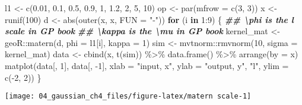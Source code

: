 \documentclass[
]{article}
\newenvironment{Shaded}{\begin{snugshade}}{\end{snugshade}}
\newcommand{\AttributeTok}[1]{\textcolor[rgb]{0.77,0.63,0.00}{#1}}
\newcommand{\ControlFlowTok}[1]{\textcolor[rgb]{0.13,0.29,0.53}{\textbf{#1}}}
\newcommand{\DecValTok}[1]{\textcolor[rgb]{0.00,0.00,0.81}{#1}}
\newcommand{\DocumentationTok}[1]{\textcolor[rgb]{0.56,0.35,0.01}{\textbf{\textit{#1}}}}
\newcommand{\FloatTok}[1]{\textcolor[rgb]{0.00,0.00,0.81}{#1}}
\newcommand{\FunctionTok}[1]{\textcolor[rgb]{0.00,0.00,0.00}{#1}}
\newcommand{\NormalTok}[1]{#1}
\newcommand{\OtherTok}[1]{\textcolor[rgb]{0.56,0.35,0.01}{#1}}
\newcommand{\SpecialCharTok}[1]{\textcolor[rgb]{0.00,0.00,0.00}{#1}}
\newcommand{\StringTok}[1]{\textcolor[rgb]{0.31,0.60,0.02}{#1}}
\begin{document}
\begin{Shaded}
\begin{Highlighting}[]
\NormalTok{l1 }\OtherTok{\textless{}{-}} \FunctionTok{c}\NormalTok{(}\FloatTok{0.01}\NormalTok{, }\FloatTok{0.1}\NormalTok{,  }\FloatTok{0.5}\NormalTok{,}
         \FloatTok{0.9}\NormalTok{,   }\DecValTok{1}\NormalTok{,  }\FloatTok{1.2}\NormalTok{, }
           \DecValTok{2}\NormalTok{,   }\DecValTok{5}\NormalTok{,  }\DecValTok{10}\NormalTok{)}
\NormalTok{op }\OtherTok{\textless{}{-}} \FunctionTok{par}\NormalTok{(}\AttributeTok{mfrow =} \FunctionTok{c}\NormalTok{(}\DecValTok{3}\NormalTok{, }\DecValTok{3}\NormalTok{))}
\NormalTok{x }\OtherTok{\textless{}{-}} \FunctionTok{runif}\NormalTok{(}\DecValTok{100}\NormalTok{)}
\NormalTok{d }\OtherTok{\textless{}{-}} \FunctionTok{abs}\NormalTok{(}\FunctionTok{outer}\NormalTok{(x, x, }\AttributeTok{FUN =} \StringTok{"{-}"}\NormalTok{))}
\ControlFlowTok{for}\NormalTok{ (i }\ControlFlowTok{in} \DecValTok{1}\SpecialCharTok{:}\DecValTok{9}\NormalTok{) \{}
  \DocumentationTok{\#\# \textbackslash{}phi is the l scale in GP book}
  \DocumentationTok{\#\# \textbackslash{}kappa is the \textbackslash{}mu in GP book}
\NormalTok{  kernel\_mat }\OtherTok{\textless{}{-}}\NormalTok{ geoR}\SpecialCharTok{::}\FunctionTok{matern}\NormalTok{(d, }\AttributeTok{phi =}\NormalTok{ l1[i], }\AttributeTok{kappa =} \DecValTok{1}\NormalTok{) }
\NormalTok{  sim }\OtherTok{\textless{}{-}}\NormalTok{ mvtnorm}\SpecialCharTok{::}\FunctionTok{rmvnorm}\NormalTok{(}\DecValTok{10}\NormalTok{, }\AttributeTok{sigma =}\NormalTok{ kernel\_mat)}
\NormalTok{  data }\OtherTok{\textless{}{-}} \FunctionTok{cbind}\NormalTok{(x, }\FunctionTok{t}\NormalTok{(sim)) }\SpecialCharTok{\%\textgreater{}\%} 
    \FunctionTok{data.frame}\NormalTok{() }\SpecialCharTok{\%\textgreater{}\%}
    \FunctionTok{arrange}\NormalTok{(}\AttributeTok{by =}\NormalTok{ x)}
  \FunctionTok{matplot}\NormalTok{(data[, }\DecValTok{1}\NormalTok{], data[, }\SpecialCharTok{{-}}\DecValTok{1}\NormalTok{], }
          \AttributeTok{xlab =} \StringTok{"input, x"}\NormalTok{, }\AttributeTok{ylab =} \StringTok{"output, y"}\NormalTok{,}
          \StringTok{"l"}\NormalTok{, }\AttributeTok{ylim =} \FunctionTok{c}\NormalTok{(}\SpecialCharTok{{-}}\DecValTok{2}\NormalTok{, }\DecValTok{2}\NormalTok{))}
\NormalTok{\}}
\end{Highlighting}
\end{Shaded}

\begin{center}\texttt{[image: 04\_gaussian\_ch4\_files/figure-latex/matern scale-1]} \end{center}
\end{document}
